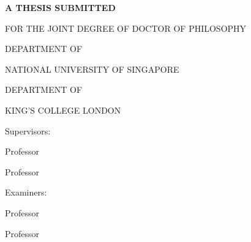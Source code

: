 
\thispagestyle{empty}

\noindent\begin{minipage}[c][\textheight]{\textwidth}
\centering
\singlespace

\large
\bfseries
\bigskip
\bigskip
\bigskip
\bigskip


\vspace*{\fill}

\mdseries


\vspace*{\fill}
\bfseries
A THESIS SUBMITTED

FOR THE JOINT DEGREE OF DOCTOR OF PHILOSOPHY

\bigskip

DEPARTMENT OF %

NATIONAL UNIVERSITY OF SINGAPORE

\bigskip

DEPARTMENT OF %

KING'S COLLEGE LONDON
\bigskip
\bigskip

\vspace*{\fill}

\normalsize
\mdseries
Supervisors:

Professor %

Professor %
\bigskip

Examiners:

Professor %

Professor %

\end{minipage}
\newpage
